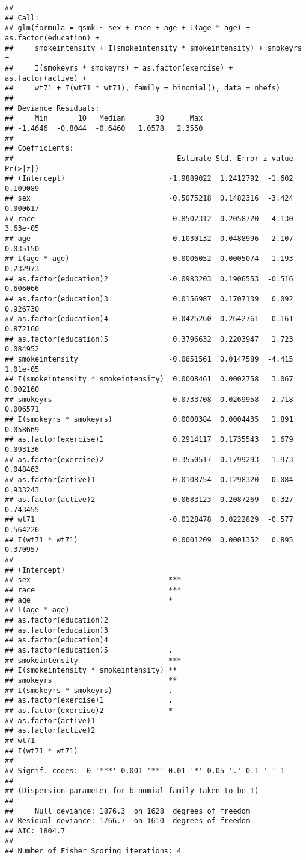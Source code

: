\documentclass[10pt,]{book}
\begin{document}
\begin{verbatim}
## 
## Call:
## glm(formula = qsmk ~ sex + race + age + I(age * age) + as.factor(education) + 
##     smokeintensity + I(smokeintensity * smokeintensity) + smokeyrs + 
##     I(smokeyrs * smokeyrs) + as.factor(exercise) + as.factor(active) + 
##     wt71 + I(wt71 * wt71), family = binomial(), data = nhefs)
## 
## Deviance Residuals: 
##     Min       1Q   Median       3Q      Max  
## -1.4646  -0.8044  -0.6460   1.0578   2.3550  
## 
## Coefficients:
##                                      Estimate Std. Error z value Pr(>|z|)
## (Intercept)                        -1.9889022  1.2412792  -1.602 0.109089
## sex                                -0.5075218  0.1482316  -3.424 0.000617
## race                               -0.8502312  0.2058720  -4.130 3.63e-05
## age                                 0.1030132  0.0488996   2.107 0.035150
## I(age * age)                       -0.0006052  0.0005074  -1.193 0.232973
## as.factor(education)2              -0.0983203  0.1906553  -0.516 0.606066
## as.factor(education)3               0.0156987  0.1707139   0.092 0.926730
## as.factor(education)4              -0.0425260  0.2642761  -0.161 0.872160
## as.factor(education)5               0.3796632  0.2203947   1.723 0.084952
## smokeintensity                     -0.0651561  0.0147589  -4.415 1.01e-05
## I(smokeintensity * smokeintensity)  0.0008461  0.0002758   3.067 0.002160
## smokeyrs                           -0.0733708  0.0269958  -2.718 0.006571
## I(smokeyrs * smokeyrs)              0.0008384  0.0004435   1.891 0.058669
## as.factor(exercise)1                0.2914117  0.1735543   1.679 0.093136
## as.factor(exercise)2                0.3550517  0.1799293   1.973 0.048463
## as.factor(active)1                  0.0108754  0.1298320   0.084 0.933243
## as.factor(active)2                  0.0683123  0.2087269   0.327 0.743455
## wt71                               -0.0128478  0.0222829  -0.577 0.564226
## I(wt71 * wt71)                      0.0001209  0.0001352   0.895 0.370957
##                                       
## (Intercept)                           
## sex                                ***
## race                               ***
## age                                *  
## I(age * age)                          
## as.factor(education)2                 
## as.factor(education)3                 
## as.factor(education)4                 
## as.factor(education)5              .  
## smokeintensity                     ***
## I(smokeintensity * smokeintensity) ** 
## smokeyrs                           ** 
## I(smokeyrs * smokeyrs)             .  
## as.factor(exercise)1               .  
## as.factor(exercise)2               *  
## as.factor(active)1                    
## as.factor(active)2                    
## wt71                                  
## I(wt71 * wt71)                        
## ---
## Signif. codes:  0 '***' 0.001 '**' 0.01 '*' 0.05 '.' 0.1 ' ' 1
## 
## (Dispersion parameter for binomial family taken to be 1)
## 
##     Null deviance: 1876.3  on 1628  degrees of freedom
## Residual deviance: 1766.7  on 1610  degrees of freedom
## AIC: 1804.7
## 
## Number of Fisher Scoring iterations: 4
\end{verbatim}
\end{document}
